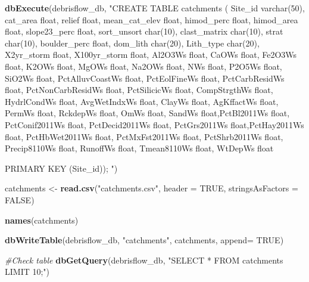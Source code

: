\documentclass[
]{book}
\newenvironment{Shaded}{\begin{snugshade}}{\end{snugshade}}
\newcommand{\CommentTok}[1]{\textcolor[rgb]{0.56,0.35,0.01}{\textit{#1}}}
\newcommand{\DataTypeTok}[1]{\textcolor[rgb]{0.13,0.29,0.53}{#1}}
\newcommand{\KeywordTok}[1]{\textcolor[rgb]{0.13,0.29,0.53}{\textbf{#1}}}
\newcommand{\NormalTok}[1]{#1}
\newcommand{\OtherTok}[1]{\textcolor[rgb]{0.56,0.35,0.01}{#1}}
\newcommand{\StringTok}[1]{\textcolor[rgb]{0.31,0.60,0.02}{#1}}
\begin{document}
\begin{Shaded}
\begin{Highlighting}[]
\KeywordTok{dbExecute}\NormalTok{(debrisflow_db, }\StringTok{"CREATE TABLE catchments (}
\StringTok{          Site_id varchar(50),}
\StringTok{          cat_area float, }
\StringTok{          relief float, }
\StringTok{          mean_cat_elev float,}
\StringTok{          himod_perc float, }
\StringTok{          himod_area float, }
\StringTok{          slope23_perc float, }
\StringTok{          sort_unsort char(10), }
\StringTok{          clast_matrix char(10), }
\StringTok{          strat char(10), }
\StringTok{          boulder_perc float, }
\StringTok{          dom_lith char(20), }
\StringTok{          Lith_type char(20), }
\StringTok{          X2yr_storm float, }
\StringTok{          X100yr_storm float,}
\StringTok{          Al2O3Ws float, CaOWs float, Fe2O3Ws float, K2OWs float, MgOWs float,}
\StringTok{          Na2OWs float, NWs float, P2O5Ws float, SiO2Ws float, }
\StringTok{          PctAlluvCoastWs float,}
\StringTok{          PctEolFineWs float, PctCarbResidWs float, PctNonCarbResidWs float, }
\StringTok{          PctSilicicWs float, CompStrgthWs float, HydrlCondWs float,}
\StringTok{          AvgWetIndxWs float, ClayWs float, AgKffactWs float, PermWs float,}
\StringTok{          RckdepWs float, OmWs float, SandWs float,PctBl2011Ws float,}
\StringTok{          PctConif2011Ws float, }
\StringTok{          PctDecid2011Ws float, PctGrs2011Ws float,PctHay2011Ws float,}
\StringTok{          PctHbWet2011Ws float, PctMxFst2011Ws float, PctShrb2011Ws float,}
\StringTok{          Precip8110Ws float, RunoffWs float, Tmean8110Ws float, WtDepWs float}

\StringTok{          PRIMARY KEY (Site_id));}
\StringTok{          "}\NormalTok{)}

\NormalTok{catchments <-}\StringTok{ }\KeywordTok{read.csv}\NormalTok{(}\StringTok{"catchments.csv"}\NormalTok{, }\DataTypeTok{header =} \OtherTok{TRUE}\NormalTok{, }\DataTypeTok{stringsAsFactors =} \OtherTok{FALSE}\NormalTok{)}

\KeywordTok{names}\NormalTok{(catchments)}

\KeywordTok{dbWriteTable}\NormalTok{(debrisflow_db, }\StringTok{"catchments"}\NormalTok{, catchments, }\DataTypeTok{append=} \OtherTok{TRUE}\NormalTok{)}
\end{Highlighting}
\end{Shaded}

\begin{Shaded}
\begin{Highlighting}[]
\CommentTok{#Check table}
\KeywordTok{dbGetQuery}\NormalTok{(debrisflow_db, }\StringTok{"SELECT * FROM catchments LIMIT 10;"}\NormalTok{)}
\end{Highlighting}
\end{Shaded}
\end{document}
